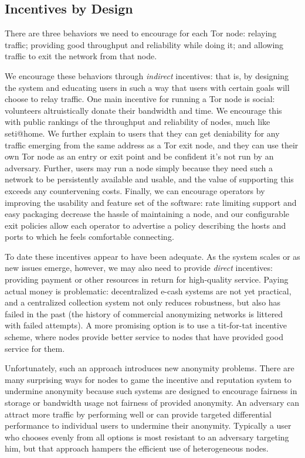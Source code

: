 \documentclass{llncs}
\begin{document}
\subsection{Incentives by Design}

There are three behaviors we need to encourage for each Tor node: relaying
traffic; providing good throughput and reliability while doing it;
and allowing traffic to exit the network from that node.

We encourage these behaviors through \emph{indirect} incentives: that
is, by designing the system and educating users in such a way that users
with certain goals will choose to relay traffic.  One
main incentive for running a Tor node is social: volunteers
altruistically donate their bandwidth and time.  We encourage this with
public rankings of the throughput and reliability of nodes, much like
seti@home.  We further explain to users that they can get
deniability for any traffic emerging from the same address as a Tor
exit node, and they can use their own Tor node
as an entry or exit point and be confident it's not run by an adversary.
Further, users may run a node simply because they need such a network
to be persistently available and usable, and the value of supporting this
exceeds any countervening costs.
Finally, we can encourage operators by improving the usability and feature
set of the software:
rate limiting support and easy packaging decrease the hassle of
maintaining a node, and our configurable exit policies allow each
operator to advertise a policy describing the hosts and ports to which
he feels comfortable connecting.

To date these incentives appear to have been adequate. As the system scales
or as new issues emerge, however, we may also need to provide
 \emph{direct} incentives:
providing payment or other resources in return for high-quality service.
Paying actual money is problematic: decentralized e-cash systems are
not yet practical, and a centralized collection system not only reduces
robustness, but also has failed in the past (the history of commercial
anonymizing networks is littered with failed attempts).  A more promising
option is to use a tit-for-tat incentive scheme, where nodes provide better
service to nodes that have provided good service for them.

Unfortunately, such an approach introduces new anonymity problems.
There are many surprising ways for nodes to game the incentive and
reputation system to undermine anonymity because such systems are
designed to encourage fairness in storage or bandwidth usage not
fairness of provided anonymity. An adversary can attract more traffic
by performing well or can provide targeted differential performance to
individual users to undermine their anonymity. Typically a user who
chooses evenly from all options is most resistant to an adversary
targeting him, but that approach hampers the efficient use
of heterogeneous nodes.
\end{document}
